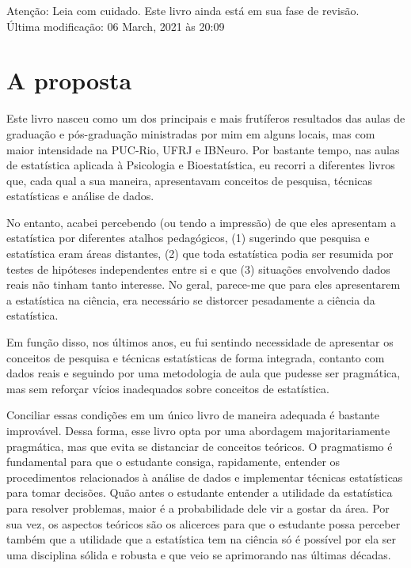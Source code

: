 \documentclass[
]{book}
\begin{document}
Atenção: Leia com cuidado. Este livro ainda está em sua fase de revisão.\\
Última modificação: 06 March, 2021 às 20:09

\hypertarget{a-proposta}{%
\section{A proposta}\label{a-proposta}}

Este livro nasceu como um dos principais e mais frutíferos resultados das aulas de graduação e pós-graduação ministradas por mim em alguns locais, mas com maior intensidade na PUC-Rio, UFRJ e IBNeuro. Por bastante tempo, nas aulas de estatística aplicada à Psicologia e Bioestatística, eu recorri a diferentes livros que, cada qual a sua maneira, apresentavam conceitos de pesquisa, técnicas estatísticas e análise de dados.

No entanto, acabei percebendo (ou tendo a impressão) de que eles apresentam a estatística por diferentes atalhos pedagógicos, (1) sugerindo que pesquisa e estatística eram áreas distantes, (2) que toda estatística podia ser resumida por testes de hipóteses independentes entre si e que (3) situações envolvendo dados reais não tinham tanto interesse. No geral, parece-me que para eles apresentarem a estatística na ciência, era necessário se distorcer pesadamente a ciência da estatística.

Em função disso, nos últimos anos, eu fui sentindo necessidade de apresentar os conceitos de pesquisa e técnicas estatísticas de forma integrada, contanto com dados reais e seguindo por uma metodologia de aula que pudesse ser pragmática, mas sem reforçar vícios inadequados sobre conceitos de estatística.

Conciliar essas condições em um único livro de maneira adequada é bastante improvável. Dessa forma, esse livro opta por uma abordagem majoritariamente pragmática, mas que evita se distanciar de conceitos teóricos. O pragmatismo é fundamental para que o estudante consiga, rapidamente, entender os procedimentos relacionados à análise de dados e implementar técnicas estatísticas para tomar decisões. Quão antes o estudante entender a utilidade da estatística para resolver problemas, maior é a probabilidade dele vir a gostar da área. Por sua vez, os aspectos teóricos são os alicerces para que o estudante possa perceber também que a utilidade que a estatística tem na ciência só é possível por ela ser uma disciplina sólida e robusta e que veio se aprimorando nas últimas décadas.
\end{document}
